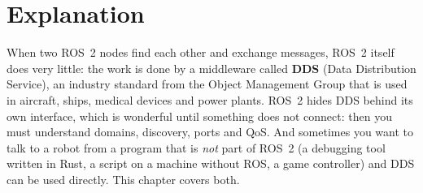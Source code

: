 \label{ch:ros2}

\section*{Explanation}
When two ROS~2 nodes find each other and exchange messages, ROS~2 itself does very little: the work is done by a middleware called \textbf{DDS} (Data Distribution Service), an industry standard from the Object Management Group that is used in aircraft, ships, medical devices and power plants. ROS~2 hides DDS behind its own interface, which is wonderful until something does not connect: then you must understand domains, discovery, ports and QoS. And sometimes you want to talk to a robot from a program that is \emph{not} part of ROS~2 (a debugging tool written in Rust, a script on a machine without ROS, a game controller) and DDS can be used directly. This chapter covers both.

